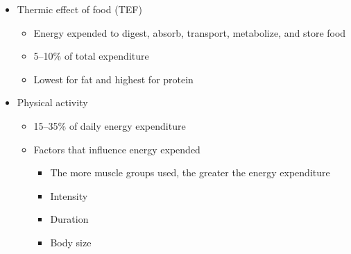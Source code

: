 \documentclass[title={Chapter 10: Achieving and Maintaining a Healthful Body Weight}]{fdsn201notes}
\begin{document}
\begin{itemize}
	\item Thermic effect of food (TEF)
	\begin{itemize}
		\item Energy expended to digest, absorb, transport, metabolize, and store food
		\item 5--10\% of total expenditure
		\item Lowest for fat and highest for protein
	\end{itemize}
	\item Physical activity
	\begin{itemize}
		\item 15--35\% of daily energy expenditure
		\item Factors that influence energy expended
		\begin{itemize}
			\item The more muscle groups used, the greater the energy expenditure
			\item Intensity
			\item Duration
			\item Body size
		\end{itemize}
	\end{itemize}
\end{itemize}
\end{document}
